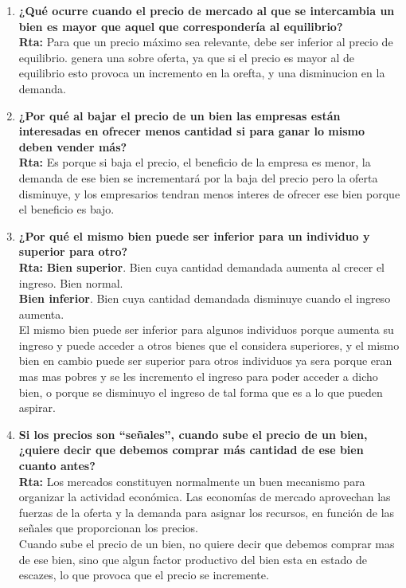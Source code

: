 \documentclass[12pt]{book}
\begin{document}
\begin{enumerate}
\item \textbf{¿Qué ocurre cuando el precio de mercado al que se intercambia un bien es mayor que aquel que correspondería al equilibrio?}
\\
\textbf{Rta: }Para que un precio máximo sea relevante, debe ser inferior al precio de equilibrio.
genera una sobre oferta, ya que si el precio es mayor al de equilibrio esto provoca un incremento en la orefta, y una disminucion en la demanda.

\item \textbf{¿Por qué al bajar el precio de un bien las empresas están interesadas en ofrecer menos cantidad si para
ganar lo mismo deben vender más?}
\\
\textbf{Rta:} Es porque si baja el precio, el beneficio de la empresa es menor, la demanda de ese bien se incrementar\'a por la baja del precio pero la oferta disminuye, y los empresarios tendran menos interes de ofrecer ese bien porque el beneficio es bajo.

\item \textbf{¿Por qué el mismo bien puede ser inferior para un individuo y superior para otro?}
\\
\textbf{Rta:}
\textbf{Bien superior}. Bien cuya cantidad demandada aumenta al crecer el ingreso. Bien normal.
\\
\textbf{Bien inferior}. Bien cuya cantidad demandada disminuye cuando el ingreso aumenta.
\\
El mismo bien puede ser inferior para algunos individuos porque aumenta su ingreso y puede acceder a otros bienes que el considera superiores, y el mismo bien en cambio puede ser superior para otros individuos ya sera porque eran mas mas pobres y se les incremento el ingreso para poder acceder a dicho bien, o porque se disminuyo el ingreso de tal forma que es a lo que pueden aspirar.


\item \textbf{Si los precios son “señales”, cuando sube el precio de un bien, ¿quiere decir que debemos comprar más cantidad de ese bien cuanto antes?}
\\
\textbf{Rta:} Los mercados constituyen normalmente un buen mecanismo para organizar la actividad económica. Las economías de mercado aprovechan las fuerzas de la oferta y la demanda para asignar los recursos, en función de las señales que proporcionan los precios.
\\
Cuando sube el precio de un bien, no quiere decir que debemos comprar mas de ese bien, sino que algun factor productivo del bien esta en estado de escazes, lo que provoca que el precio se incremente.
\end{enumerate}
\end{document}
